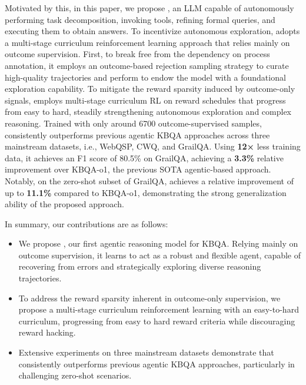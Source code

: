 Motivated by this, in this paper, we propose \ours, an LLM capable of autonomously performing task decomposition, invoking tools, refining formal queries, and executing them to obtain answers. To incentivize autonomous exploration, \ours\space adopts a multi-stage curriculum reinforcement learning approach that relies mainly on outcome supervision. First, to break free from the dependency on process annotation, it employs an outcome-based rejection sampling strategy to curate high-quality trajectories and perform to endow the model with a foundational exploration capability. To mitigate the reward sparsity induced by outcome-only signals, \ours\space employs multi-stage curriculum RL on reward schedules that progress from easy to hard, steadily strengthening autonomous exploration and complex reasoning. Trained with only around 6700 outcome-supervised samples, \ours\space consistently outperforms previous agentic KBQA approaches across three mainstream datasets, i.e., WebQSP, CWQ, and GrailQA. Using \textbf{12×} less training data, it achieves an F1 score of 80.5\% on GrailQA, achieving a \textbf{3.3\%} relative improvement over KBQA-o1, the previous SOTA agentic-based approach. Notably, on the zero-shot subset of GrailQA, \ours\space achieves a relative improvement of up to \textbf{11.1\%} compared to KBQA-o1, demonstrating the strong generalization ability of the proposed approach.


In summary, our contributions are as follows:
\begin{itemize}
    \item  We propose \ours, our first agentic reasoning model for KBQA. Relying mainly on outcome supervision, it learns to act as a robust and flexible agent, capable of recovering from errors and strategically exploring diverse reasoning trajectories.

    \item To address the reward sparsity inherent in outcome-only supervision, we propose a multi-stage curriculum reinforcement learning with an easy-to-hard curriculum, progressing from easy to hard reward criteria while discouraging reward hacking.
    
    \item Extensive experiments on three mainstream datasets demonstrate that \ours\space consistently outperforms previous agentic KBQA approaches, particularly in challenging zero-shot scenarios.
\end{itemize}